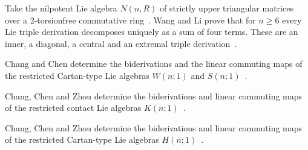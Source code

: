 Take the nilpotent Lie algebra $N(n,R)$ of strictly upper triangular matrices
over a 2-torsionfree commutative ring~\cite{WlLieTripleDerivationOfTheLieAlg2009}. Wang and Li prove that for $n\geq 6$
every Lie triple derivation decomposes uniquely as a sum of four terms. These
are an inner, a diagonal, a central and an extremal triple
derivation~\cite{WlLieTripleDerivationOfTheLieAlg2009}.

Chang and Chen determine the biderivations and the linear commuting maps of
the restricted Cartan-type Lie algebras $W(n;1)$ and
$S(n;1)$~\cite{WlBiderivationsAndLinearCommutin2018}.

Chang, Chen and Zhou determine the biderivations and linear commuting maps of
the restricted contact Lie algebras
$K(n;1)$~\cite{WlBiderivationsAndLinearCommutin2021}.

Chang, Chen and Zhou determine the biderivations and linear commuting maps of
the restricted Cartan-type Lie algebras
$H(n;1)$~\cite{WlBiderivationsAndLinearCommutin2019}.
